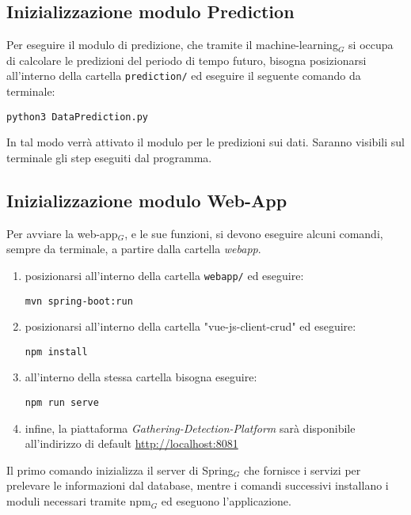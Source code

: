 \subsection{Inizializzazione modulo Prediction}\label{RequisitiDiSistemaEdInstallazioneInstallazioneInizializzazioneModuloPrediction}
Per eseguire il modulo di predizione, che tramite il machine-learning$_G$ si occupa di calcolare le predizioni del periodo di tempo futuro, bisogna posizionarsi all'interno della cartella \texttt{prediction/} ed eseguire il seguente comando da terminale:

\begin{lstlisting}
python3 DataPrediction.py
\end{lstlisting}
In tal modo verrà attivato il modulo per le predizioni sui dati.
Saranno visibili sul terminale gli step eseguiti dal programma.

\subsection{Inizializzazione modulo Web-App}\label{RequisitiDiSistemaEdInstallazioneInstallazioneInizializzazioneModuloWebApp}
Per avviare la web-app$_G$, e le sue funzioni, si devono eseguire alcuni comandi, sempre da terminale, a partire dalla cartella \textit{webapp}.
\begin{enumerate}
	\item posizionarsi all'interno della cartella \texttt{webapp/} ed eseguire:
\begin{lstlisting}
mvn spring-boot:run
\end{lstlisting}
\item posizionarsi all'interno della cartella "vue-js-client-crud" ed eseguire:
\begin{lstlisting}
npm install
\end{lstlisting}
\item all'interno della stessa cartella bisogna eseguire:
\begin{lstlisting}
npm run serve
\end{lstlisting}
\item infine, la piattaforma \textit{Gathering-Detection-Platform} sarà disponibile all'indirizzo di default \url{http://localhost:8081} 
\end{enumerate}
Il primo comando inizializza il server di Spring$_G$ che fornisce i servizi per prelevare le informazioni dal database, mentre i comandi successivi installano i moduli necessari tramite npm$_G$ ed eseguono l'applicazione.

